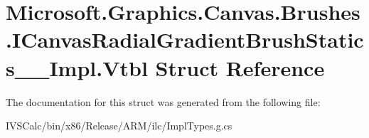 \hypertarget{struct_microsoft_1_1_graphics_1_1_canvas_1_1_brushes_1_1_i_canvas_radial_gradient_brush_statics_____impl_1_1_vtbl}{}\section{Microsoft.\+Graphics.\+Canvas.\+Brushes.\+I\+Canvas\+Radial\+Gradient\+Brush\+Statics\+\_\+\+\_\+\+Impl.\+Vtbl Struct Reference}
\label{struct_microsoft_1_1_graphics_1_1_canvas_1_1_brushes_1_1_i_canvas_radial_gradient_brush_statics_____impl_1_1_vtbl}


The documentation for this struct was generated from the following file\+:\begin{DoxyCompactItemize}
\item 
I\+V\+S\+Calc/bin/x86/\+Release/\+A\+R\+M/ilc/Impl\+Types.\+g.\+cs\end{DoxyCompactItemize}
